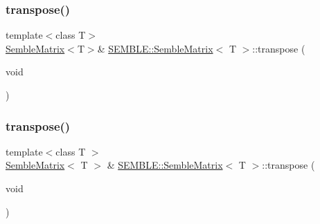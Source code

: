 \subsubsection{\texorpdfstring{transpose()}{transpose()}\hspace{0.1cm}{\footnotesize\ttfamily [1/2]}}
{\footnotesize\ttfamily template$<$class T$>$ \\
\mbox{\hyperlink{structSEMBLE_1_1SembleMatrix}{Semble\+Matrix}}$<$T$>$\& \mbox{\hyperlink{structSEMBLE_1_1SembleMatrix}{S\+E\+M\+B\+L\+E\+::\+Semble\+Matrix}}$<$ T $>$\+::transpose (\begin{DoxyParamCaption}\item[{void}]{ }\end{DoxyParamCaption})}

\mbox{\label{structSEMBLE_1_1SembleMatrix_a2013e3dd6f0dbfc71933b7e2c0a6e716}} 
\subsubsection{\texorpdfstring{transpose()}{transpose()}\hspace{0.1cm}{\footnotesize\ttfamily [2/2]}}
{\footnotesize\ttfamily template$<$class T $>$ \\
\mbox{\hyperlink{structSEMBLE_1_1SembleMatrix}{Semble\+Matrix}}$<$ T $>$ \& \mbox{\hyperlink{structSEMBLE_1_1SembleMatrix}{S\+E\+M\+B\+L\+E\+::\+Semble\+Matrix}}$<$ T $>$\+::transpose (\begin{DoxyParamCaption}\item[{void}]{ }\end{DoxyParamCaption})}

